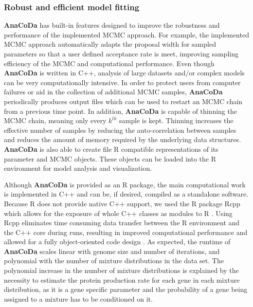 \documentclass{bioinfo}
\newcommand{\package}{\textbf{AnaCoDa }} %
\begin{document}
\subsubsection*{Robust and efficient model fitting}
\package has built-in features designed to improve the robustness and performance of the implemented MCMC approach. 
For example, the implemented MCMC approach automatically adapts the proposal width for sampled parameters so that a user defined acceptance rate is meet, improving sampling efficiency of the MCMC and computational performance.
Even though \package is written in C++, analysis of large datasets and/or complex models can be very computationally intensive.
In order to protect users from computer failures or aid in the collection of additional MCMC samples, \package periodically produces output files which can be used to restart an MCMC chain from a previous time point.
In addition, \package is capable of thinning the MCMC chain, meaning only every $k^{th}$ sample is kept. 
Thinning increases the effective number of samples by reducing the auto-correlation between samples and reduces the amount of memory required by the underlying data structures. 
\package is also able to create file R compatible representations of its parameter and MCMC objects.
These objects can be loaded into the R environment for model analysis and visualization.

Although \package is provided as an R package, the main computational work is implemented in C++ and can be, if desired, compiled as a standalone software.
Because R does not provide native C++ support, we used the R package Rcpp which allows for the exposure of whole C++ classes as modules to R \citep{rcpp_package}.
Using Rcpp eliminates time consuming data transfer between the R environment and the C++ core during runs, resulting in improved computational performance and allowed for a fully object-oriented code design \citep{ood_book}. 
As expected, the runtime of \package scales linear with genome size and number of iterations, and polynomial with the number of mixture distributions in the data set. The polynomial increase in the number of mixture distributions is explained by the necessity to estimate the protein production rate for each gene in each mixture distribution, as it is a gene specific parameter and the probability of a gene being assigned to a mixture has to be conditioned on it.
\end{document}
